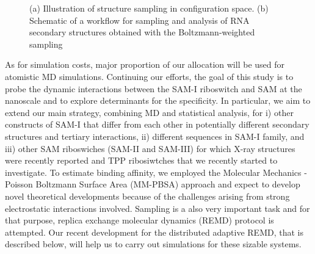 \documentclass[a4paper,10pt]{article}
\begin{document}
\begin{figure}
\begin{center}
\end{center}
\caption{(a) Illustration of structure sampling in configuration space.  (b) Schematic of a workflow for sampling and analysis of RNA secondary structures obtained with the Boltzmann-weighted sampling}
\label{fig:folding energy landscape}
\end{figure}


As for simulation costs, major proportion of our allocation will be used for atomistic MD simulations.  Continuing our efforts, the goal of this study is to probe the dynamic interactions between the SAM-I riboswitch and SAM at the nanoscale and to explore determinants for the specificity. In particular, we aim to extend our main strategy, combining MD and statistical analysis, for i) other constructs of SAM-I that differ from each other in potentially different secondary structures and tertiary interactions, ii) different sequences in SAM-I family, and iii) other SAM riboswiches (SAM-II and SAM-III) for which X-ray structures were recently reported and TPP ribosiwtches that we recently started to investigate.  To estimate binding affinity, we employed the Molecular Mechanics - Poisson Boltzmann Surface Area (MM-PBSA) approach and expect to develop novel theoretical developments because of the challenges arising from strong electrostatic interactions involved.  Sampling is a also very important task and for that purpose, replica exchange molecular dynamics (REMD) protocol is attempted.  Our recent development for the distributed adaptive REMD, that is described below, will help us to carry out simulations for these sizable systems.
\end{document}
